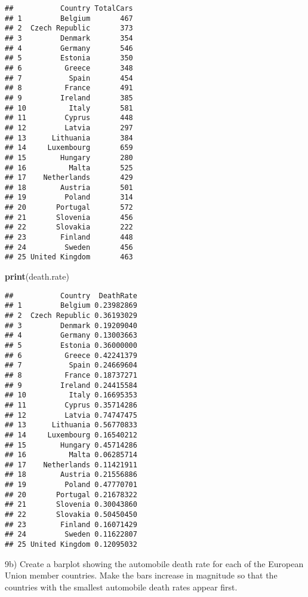 \documentclass[
]{article}
\newenvironment{Shaded}{\begin{snugshade}}{\end{snugshade}}
\newcommand{\FunctionTok}[1]{\textcolor[rgb]{0.13,0.29,0.53}{\textbf{#1}}}
\newcommand{\NormalTok}[1]{#1}
\begin{document}
\begin{verbatim}
##           Country TotalCars
## 1         Belgium       467
## 2  Czech Republic       373
## 3         Denmark       354
## 4         Germany       546
## 5         Estonia       350
## 6          Greece       348
## 7           Spain       454
## 8          France       491
## 9         Ireland       385
## 10          Italy       581
## 11         Cyprus       448
## 12         Latvia       297
## 13      Lithuania       384
## 14     Luxembourg       659
## 15        Hungary       280
## 16          Malta       525
## 17    Netherlands       429
## 18        Austria       501
## 19         Poland       314
## 20       Portugal       572
## 21       Slovenia       456
## 22       Slovakia       222
## 23        Finland       448
## 24         Sweden       456
## 25 United Kingdom       463
\end{verbatim}

\begin{Shaded}
\begin{Highlighting}[]
\FunctionTok{print}\NormalTok{(death.rate)}
\end{Highlighting}
\end{Shaded}

\begin{verbatim}
##           Country  DeathRate
## 1         Belgium 0.23982869
## 2  Czech Republic 0.36193029
## 3         Denmark 0.19209040
## 4         Germany 0.13003663
## 5         Estonia 0.36000000
## 6          Greece 0.42241379
## 7           Spain 0.24669604
## 8          France 0.18737271
## 9         Ireland 0.24415584
## 10          Italy 0.16695353
## 11         Cyprus 0.35714286
## 12         Latvia 0.74747475
## 13      Lithuania 0.56770833
## 14     Luxembourg 0.16540212
## 15        Hungary 0.45714286
## 16          Malta 0.06285714
## 17    Netherlands 0.11421911
## 18        Austria 0.21556886
## 19         Poland 0.47770701
## 20       Portugal 0.21678322
## 21       Slovenia 0.30043860
## 22       Slovakia 0.50450450
## 23        Finland 0.16071429
## 24         Sweden 0.11622807
## 25 United Kingdom 0.12095032
\end{verbatim}

9b) Create a barplot showing the automobile death rate for each of the
European Union member countries. Make the bars increase in magnitude so
that the countries with the smallest automobile death rates appear
first.
\end{document}
